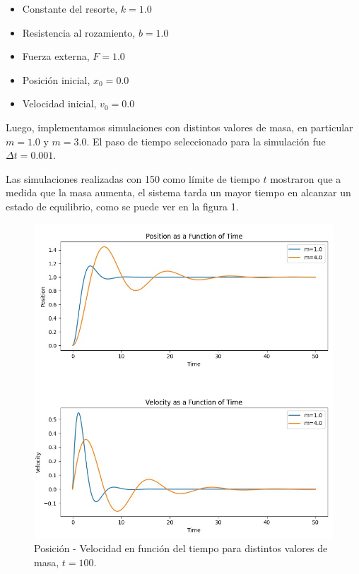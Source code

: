 \documentclass[]{article}
\begin{document}
\begin{itemize}
\item Constante del resorte, $k = 1.0$
\item Resistencia al rozamiento, $b = 1.0$
\item Fuerza externa, $F = 1.0$
\item Posición inicial, $x_0 = 0.0$
\item Velocidad inicial, $v_0 = 0.0$
\end{itemize}

Luego, implementamos simulaciones con distintos valores de masa, en particular $m = 1.0$ y $m = 3.0$. El paso de tiempo seleccionado para la simulación fue $\Delta t= 0.001$.

Las simulaciones realizadas con 150 como límite de tiempo $t$ mostraron que a medida que la masa aumenta, el sistema tarda un mayor tiempo en alcanzar un estado de equilibrio, como se puede ver en la figura 1.



\begin{figure}[H]
\centering
\includegraphics[width=\textwidth]{../assets/figure_1_mass.jpeg}
\caption{Posición - Velocidad en función del tiempo para distintos valores de masa, $t = 100$.}
\end{figure}
\end{document}
